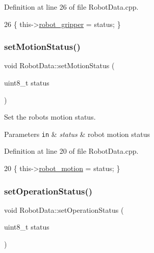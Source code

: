Definition at line 26 of file Robot\+Data.\+cpp.


\begin{DoxyCode}
26 \{ this->\hyperlink{class_robot_data_a83aa1b34c8785aa24e1fc358e50dfc26}{robot\_gripper} = status; \}
\end{DoxyCode}
\mbox{\label{class_robot_data_a72b1b729501cd7a0620e83c5d4d9a714}} 
\subsubsection{\texorpdfstring{set\+Motion\+Status()}{setMotionStatus()}}
{\footnotesize\ttfamily void Robot\+Data\+::set\+Motion\+Status (\begin{DoxyParamCaption}\item[{uint8\+\_\+t}]{status }\end{DoxyParamCaption})}



Set the robot\textquotesingle{}s motion status. 


\begin{DoxyParams}[1]{Parameters}
\mbox{\tt in}  & {\em status} & robot motion status \\
\hline
\end{DoxyParams}


Definition at line 20 of file Robot\+Data.\+cpp.


\begin{DoxyCode}
20 \{ this->\hyperlink{class_robot_data_aaa03c73d21d0d28a8b1b3d384d777a1e}{robot\_motion} = status; \}
\end{DoxyCode}
\mbox{\label{class_robot_data_a2676bf89bd178c2a9a38236d936a49c0}} 
\subsubsection{\texorpdfstring{set\+Operation\+Status()}{setOperationStatus()}}
{\footnotesize\ttfamily void Robot\+Data\+::set\+Operation\+Status (\begin{DoxyParamCaption}\item[{uint8\+\_\+t}]{status }\end{DoxyParamCaption})}



